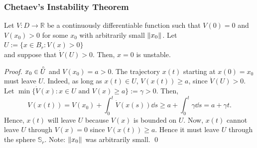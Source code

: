 \begin{frame}
    \frametitle{Chetaev's Instability Theorem}

    \begin{theorem}
        Let $V: D \rightarrow \mathbb{R}$ be a continuously differentiable
        function such that $V(0) = 0$ and $V(x_0) > 0$ for some $x_0$ with
        arbitrarily small $\|{x_0}\|_{{}_{}}$. Let\\[0.5ex] \hspace{35mm} $U := \{ x
        \in B_r: V(x) > 0\}$\\[0.5ex] and suppose that $\dot{V}(U) > 0$. Then,
        $x=0$ is unstable.
    \end{theorem}

    \begin{proof}
        $x_0 \in \accentset{\circ}{U}$ and $V(x_0) = a > 0$. The trajectory
        $x(t)$ starting at $x(0) = x_0$ must leave $U$. Indeed, as long as $x(t)
        \in U$, $V(x(t)) \geq a$, since $\dot{V}(U) > 0$. Let $\min 
        \{\dot{V}(x): x \in U \text{ and } V(x) \geq a \} := \gamma > 0$.  Then, 
        \[ V(x(t)) = V(x_0) + \int_0^t \dot{V}(x(s)) \dd s \geq a + \int_0^t
        \gamma \dd s = a + \gamma t. \] Hence, $x(t)$ will leave $U$ because
        $V(x)$ is bounded on $U$. Now, $x(t)$ cannot leave $U$ through $V(x) =
        0$ since $V(x(t)) \geq a$. Hence it must leave $U$ through the sphere
        $\mathbb{S}_r$. Note: $\|{x_0}\|_{{}_{}}$ was arbitrarily small. \hfill \qed
    \end{proof}
\end{frame}

\endgroup